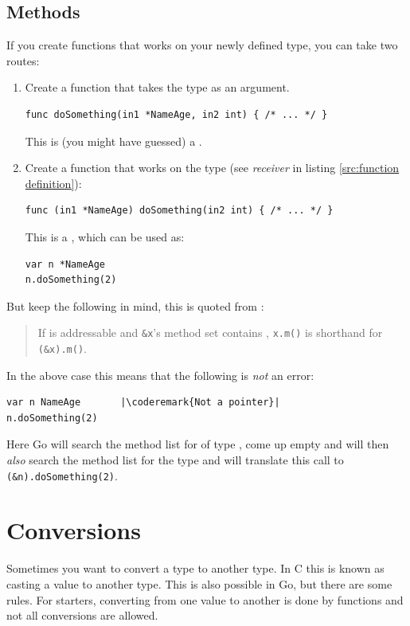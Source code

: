 
\subsection{Methods}
\label{sec:methods}
If you create functions that works on your newly defined type, you can
take two routes:
\begin{enumerate}
\item Create a function that takes the type as an argument.
\begin{lstlisting}
func doSomething(in1 *NameAge, in2 int) { /* ... */ }
\end{lstlisting}
This is (you might have guessed) a .
\item Create a function that works on the type (see \emph{receiver} in
listing \ref{src:function definition}):
\begin{lstlisting}
func (in1 *NameAge) doSomething(in2 int) { /* ... */ }
\end{lstlisting}
This is a , which can be
used as: 
\begin{lstlisting}
var n *NameAge
n.doSomething(2)
\end{lstlisting}
\end{enumerate}
But keep the following in mind, this is quoted from \cite{go_spec}:
\begin{quote}
If  is
addressable and \lstinline{&x}'s method set contains , 
\lstinline{x.m()} is shorthand for \lstinline{(&x).m()}.
\end{quote}
In the above case this means that the following is \emph{not} an 
error:
\begin{lstlisting}
var n NameAge	    |\coderemark{Not a pointer}|
n.doSomething(2)    
\end{lstlisting}
Here Go will search the method list for  of type ,
come up empty and will then \emph{also} search the method list for
the type  and will translate this call to
\lstinline{(&n).doSomething(2)}.

\section{Conversions}
\label{sec:conversions}
Sometimes you want to convert a type to another type. In C this is known
as casting a value to another type. This is also possible in Go, but
there are some rules. For starters, converting from one value to another
is done by functions and not all conversions are allowed.

